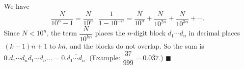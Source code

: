 We have
\[\dfrac{N}{10^n-1}=\dfrac{N}{10^n}\cdot\dfrac{1}{1-10^{-n}}=\dfrac{N}{10^n}+\dfrac{N}{10^{2n}}+\dfrac{N}{10^{3n}}+\cdots.\]
Since $N<10^n$, the term $\dfrac{N}{10^{kn}}$ places the $n$-digit block $d_1\cdots d_n$ in decimal places $(k-1)n+1$ to $kn$, and the blocks do not overlap. So the sum is $0.d_1\cdots d_nd_1\cdots d_n\ldots=0.\overline{d_1\cdots d_n}$. (Example: $\dfrac{37}{999}=0.\overline{037}$.) $\blacksquare$
